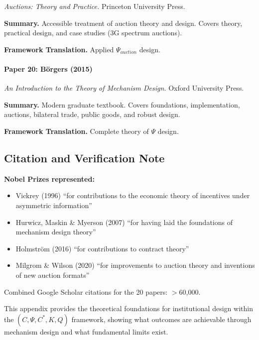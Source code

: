 \textit{Auctions: Theory and Practice.}
Princeton University Press.

\textbf{Summary.}
Accessible treatment of auction theory and design. Covers theory, 
practical design, and case studies (3G spectrum auctions).

\textbf{Framework Translation.}
Applied $\Psi_{auction}$ design.

\paragraph{Paper 20: Börgers (2015)}

\textit{An Introduction to the Theory of Mechanism Design.}
Oxford University Press.

\textbf{Summary.}
Modern graduate textbook. Covers foundations, implementation, auctions, 
bilateral trade, public goods, and robust design.

\textbf{Framework Translation.}
Complete theory of $\Psi$ design.

\subsection{Citation and Verification Note}

\textbf{Nobel Prizes represented:}
\begin{itemize}
    \item Vickrey (1996) ``for contributions to the economic theory of incentives under asymmetric information''
    \item Hurwicz, Maskin \& Myerson (2007) ``for having laid the foundations of mechanism design theory''
    \item Holmström (2016) ``for contributions to contract theory''
    \item Milgrom \& Wilson (2020) ``for improvements to auction theory and inventions of new auction formats''
\end{itemize}

Combined Google Scholar citations for the 20 papers: $>$60,000.

This appendix provides the theoretical foundations for institutional design 
within the $(C, \Psi, C^*, K, Q)$ framework, showing what outcomes are 
achievable through mechanism design and what fundamental limits exist.



